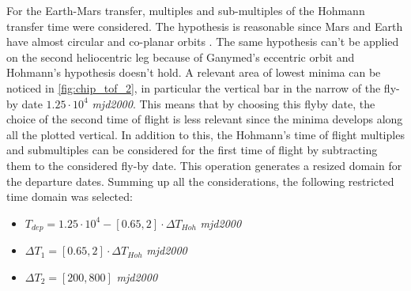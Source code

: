 For the Earth-Mars transfer, multiples and sub-multiples of the Hohmann transfer time were considered. The hypothesis is reasonable since Mars and Earth have almost circular and co-planar orbits \cite{global_optimisation}. The same hypothesis can't be applied on the second heliocentric leg because of Ganymed's eccentric orbit and Hohmann's hypothesis doesn't hold. 
A relevant area of lowest minima can be noticed in \autoref{fig:chip_tof_2}, in particular the vertical bar in the narrow of the fly-by date $1.25 \cdot 10^4$ \textit{mjd2000}. This means that by choosing this flyby date, the choice of the second time of flight is less relevant since the minima develops along all the plotted vertical. In addition to this, the Hohmann's time of flight multiples and submultiples can be considered for the first time of flight by subtracting them to the considered fly-by date. This operation generates a resized domain for the departure dates.
Summing up all the considerations, the following restricted time domain was selected:
\begin{itemize}
    [wide,itemsep=3pt,topsep=3pt]
    \item $T_{dep} = 1.25 \cdot 10^4 - \left[0.65, 2\right]\cdot \Delta T_{Hoh} $ \textit{mjd2000}
    \item $\Delta T_1 =  \left[0.65, 2\right]\cdot \Delta T_{Hoh}$ \textit{mjd2000}
    \item $\Delta T_2 = \left[200, 800\right]$ \textit{mjd2000}
\end{itemize}


\label{subsec:final_window}